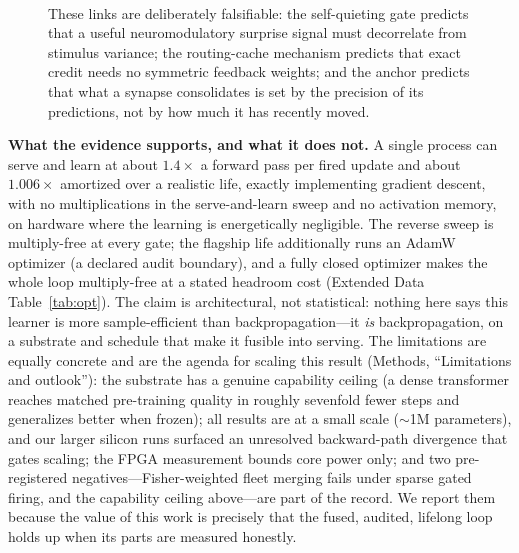 \documentclass[11pt]{article}
\newcommand{\heading}[1]{\vspace{4pt}\noindent\textbf{#1}\hspace{0.6em}}
\begin{document}
\begin{figure}[t]
{\begin{minipage}{0.94\columnwidth}
\begin{tabular}{@{}p{0.30\linewidth}p{0.63\linewidth}@{}}
\bottomrule
\end{tabular}
\vspace{2pt}\\
\footnotesize These links are deliberately falsifiable: the self-quieting gate
predicts that a useful neuromodulatory surprise signal must decorrelate from
stimulus variance; the routing-cache mechanism predicts that exact credit needs no
symmetric feedback weights\cite{lillicrap2016random,payeur2021burst,
bellec2020solution}; and the anchor predicts that what a synapse consolidates is
set by the precision of its predictions, not by how much it has recently moved.
\end{minipage}}
\label{box:neuro}
\end{figure}

\heading{What the evidence supports, and what it does not.}
A single process can serve and learn at about $1.4\times$ a forward pass per
fired update and about $1.006\times$ amortized over a realistic life, exactly
implementing gradient descent, with no multiplications in the serve-and-learn
sweep and no activation memory, on hardware where the learning is energetically
negligible. The reverse sweep is multiply-free at every gate; the flagship life
additionally runs an AdamW optimizer (a declared audit boundary), and a fully
closed optimizer makes the whole loop multiply-free at a stated headroom cost
(Extended Data Table~\ref{tab:opt}). The claim is architectural, not statistical: nothing here says this
learner is more sample-efficient than backpropagation---it \emph{is}
backpropagation, on a substrate and schedule that make it fusible into serving.
The limitations are equally concrete and are the agenda for scaling this result
(Methods, ``Limitations and outlook''): the substrate has a genuine capability
ceiling (a dense transformer reaches matched pre-training quality in roughly
sevenfold fewer steps and generalizes better when frozen); all results are at a
small scale ($\sim$1M parameters), and our larger silicon runs surfaced an
unresolved backward-path divergence that gates scaling; the FPGA measurement
bounds core power only; and two pre-registered negatives---Fisher-weighted fleet
merging fails under sparse gated firing, and the capability ceiling above---are
part of the record. We report them because the value of this work is precisely
that the fused, audited, lifelong loop holds up when its parts are measured
honestly.

\vspace{6pt}
\end{document}

